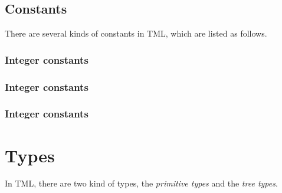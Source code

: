 \documentclass[12pt,psfig,a4]{article}
\begin{document}
%


\subsection {Constants}
There are several kinds of constants in TML, which are listed as follows.
\subsubsection {Integer constants}

\subsubsection {Integer constants}

\subsubsection {Integer constants}


\section {Types}
In TML, there are two kind of types, the \textit{primitive types} and the \textit{tree types}.
\end{document}

